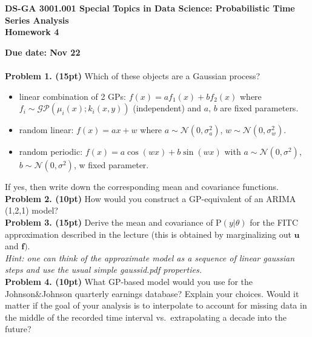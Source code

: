 \documentclass[12pt]{article}
\newcommand{\p}{\mathrm{P}}
\newcommand{\vect}[1]{\mathbf{#1}}
\begin{document}
\thispagestyle{empty}
\begin{center}

\textbf{DS-GA 3001.001 Special Topics in Data Science: Probabilistic Time Series Analysis\\
Homework 4}
\end{center}

\noindent \textbf{Due date: Nov  22}\\
\\
\noindent \textbf{Problem 1. (15pt)} Which of these objects are a Gaussian process?
\begin{itemize}
\item linear combination of 2 GPs: $f(x) = a f_1(x) + b f_2(x)$ where $f_i \sim \mathcal{GP}(\mu_i(x); k_i(x,y))$ (independent) and $a,\, b$ are fixed parameters.
\item random linear: $ f(x) = a x + w$ where $a \sim \mathcal{N}(0,\sigma_a^2)$, $w\sim \mathcal{N}(0,\sigma_w^2)$.
\item random periodic: $f(x) = a \cos(wx)+ b \sin(wx)$ with $a \sim \mathcal{N}(0,\sigma^2)$, $b \sim \mathcal{N}(0,\sigma^2)$, w fixed parameter.
\end{itemize}
If yes, then write down the corresponding mean and covariance functions.\\

\noindent \textbf{Problem 2. (10pt)} 
How would you construct a GP-equivalent of an ARIMA (1,2,1) model?\\

\noindent \textbf{Problem 3. (15pt)} 
Derive the mean and covariance of  $\mathrm{P}(y|\theta)$ for the FITC approximation described in the lecture (this is obtained by marginalizing out $\mathbf{u}$ and $\mathbf{f})$.\\
\noindent \emph{Hint: one can think of the approximate model as a sequence of linear gaussian steps and use the usual simple gaussid.pdf properties.}\\

\noindent \textbf{Problem 4. (10pt)} 
What GP-based model would you use for the Johnson\&Johnson quarterly earnings database?
Explain your choices. Would it matter if the goal of your analysis is to interpolate to account for missing data in the middle of the recorded time interval vs.\ extrapolating a decade into the future?\\
\end{document}

